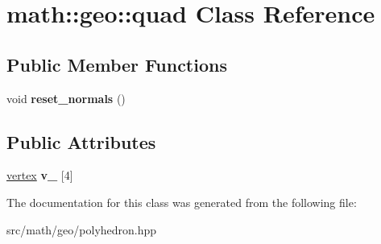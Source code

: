 \hypertarget{classmath_1_1geo_1_1quad}{
\section{math::geo::quad Class Reference}
\label{classmath_1_1geo_1_1quad}
}
\subsection*{Public Member Functions}
\begin{DoxyCompactItemize}
\item 
\hypertarget{classmath_1_1geo_1_1quad_a61f7422d3d82b7acab0aabd71b68fccf}{
void {\bfseries reset\_\-normals} ()}
\label{classmath_1_1geo_1_1quad_a61f7422d3d82b7acab0aabd71b68fccf}

\end{DoxyCompactItemize}
\subsection*{Public Attributes}
\begin{DoxyCompactItemize}
\item 
\hypertarget{classmath_1_1geo_1_1quad_a6625bbd8467b8a853aae1f4f2a2362ec}{
\hyperlink{classmath_1_1geo_1_1vertex}{vertex} {\bfseries v\_\-} \mbox{[}4\mbox{]}}
\label{classmath_1_1geo_1_1quad_a6625bbd8467b8a853aae1f4f2a2362ec}

\end{DoxyCompactItemize}


The documentation for this class was generated from the following file:\begin{DoxyCompactItemize}
\item 
src/math/geo/polyhedron.hpp\end{DoxyCompactItemize}
